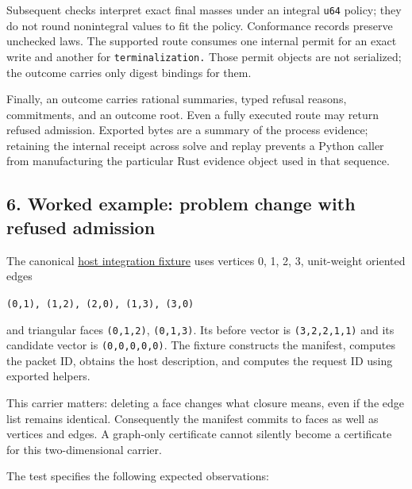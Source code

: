 \documentclass[
  11pt,
]{article}
\newcommand{\passthrough}[1]{#1}
\begin{document}
Subsequent checks interpret exact final masses under an integral
\passthrough{\lstinline!u64!} policy; they do not round nonintegral
values to fit the policy. Conformance records preserve unchecked laws.
The supported route consumes one internal permit for an exact write and
another for \nolinkurl{terminalization.} Those permit objects are not
serialized; the outcome carries only digest bindings for them.

Finally, an outcome carries rational summaries, typed refusal reasons,
commitments, and an outcome root. Even a fully executed route may return
refused admission. Exported bytes are a summary of the process evidence;
retaining the internal receipt across solve and replay prevents a Python
caller from manufacturing the particular Rust evidence object used in
that sequence.

\subsection{6. Worked example: problem change with refused
admission}\label{worked-example-problem-change-with-refused-admission}

The canonical
\href{https://github.com/dbccpage/the_symbol_game/blob/52cb5457f6c485ba548cfd292f6012a941ed22cf/omega_engine/crates_rs/omega_symbol_game/tests/host_contract.rs}{host
integration fixture} uses vertices 0, 1, 2, 3, unit-weight oriented
edges

\passthrough{\lstinline!(0,1), (1,2), (2,0), (1,3), (3,0)!}

and triangular faces \passthrough{\lstinline!(0,1,2)!},
\passthrough{\lstinline!(0,1,3)!}. Its before vector is
\passthrough{\lstinline!(3,2,2,1,1)!} and its candidate vector is
\passthrough{\lstinline!(0,0,0,0,0)!}. The fixture constructs the
manifest, computes the packet ID, obtains the host description, and
computes the request ID using exported helpers.

This carrier matters: deleting a face changes what closure means, even
if the edge list remains identical. Consequently the manifest commits to
faces as well as vertices and edges. A graph-only certificate cannot
silently become a certificate for this two-dimensional carrier.

The test specifies the following expected observations:
\end{document}
